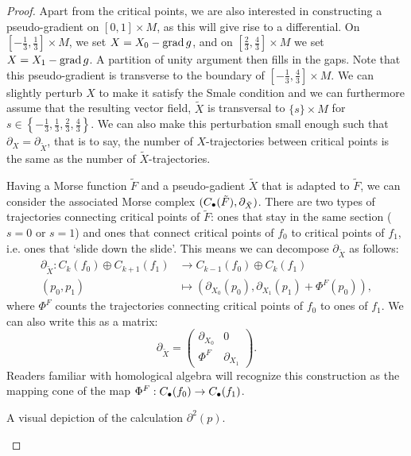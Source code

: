 \begin{proof}
Apart from the critical points, we are also interested in constructing a pseudo-gradient on $[0,1]\times M$, as this will give rise to a differential.
 On $[-\frac{1}{3}, \frac{1}{3}] \times M$, we set $X = X_0 - \operatorname{grad} g$, and on $\left[\frac{2}{3}, \frac{4}{3}\right] \times M$ we set $X = X_1 - \operatorname{grad} g$.
A partition of unity argument then fills in the gaps.
Note that this pseudo-gradient is transverse to the boundary of $\left[-\frac{1}{3}, \frac{4}{3}\right] \times M$.
We can slightly perturb $X$ to make it satisfy the Smale condition and we can furthermore assume that the resulting vector field, $\tilde{X}$ is transversal to $ \{s\} \times M$ for $s \in \left\{-\frac{1}{3}, \frac{1}{3}, \frac{2}{3}, \frac{4}{3}\right\}$.
We can also make this perturbation small enough such that $\partial_{X} = \partial_{\tilde{X}}$, that is to say, the number of $X$-trajectories between critical points is the same as the number of $\tilde{X}$-trajectories.

Having a Morse function $\tilde{F}$ and a pseudo-gadient $\tilde{X}$ that is adapted to $\tilde{F}$, we can consider the associated Morse complex $(C_\bullet(\tilde{F}), \partial_{\tilde{X}})$.
There are two types of trajectories connecting critical points of $\tilde{F}$: ones that stay in the same section ($s = 0$ or $s = 1$)  and ones that connect critical points of $f_0$ to critical points of $f_1$, i.e. ones that `slide down the slide'.
This means we can decompose $\partial_{\tilde{X}}$ as follows:
\begin{align*}
    \partial_{\tilde{X}}: C_k(f_0) \oplus C_{k+1}(f_1) &\longrightarrow C_{k-1}(f_0) \oplus C_k(f_1) \\
    (p_0, p_1) &\longmapsto (\partial_{X_0}(p_0), \partial_{X_1}(p_1)+ \Phi^{F}(p_0))
,\end{align*}
where $\Phi^{F}$ counts the trajectories connecting critical points of $f_0$ to ones of $f_1$. We can also write this as a matrix:
\[
\partial_{\tilde{X}} = \begin{pmatrix}
    \partial_{X_0} & 0 \\
     \Phi^{F}& \partial_{X_1}
\end{pmatrix}
.\] 
Readers familiar with homological algebra will recognize this construction as the mapping cone of the map $\Phi^{F}: C_\bullet(f_0) \to  C_\bullet(f_1)$.

\begin{marginfigure}
    \centering
    \caption{A visual depiction of the calculation $\partial^2(p)$.}
    \label{fig:morse-homology-independence-partial-squared-zero}
\end{marginfigure}


\end{proof}
